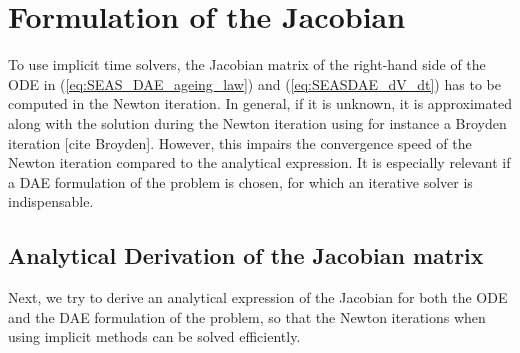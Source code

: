 \section{Formulation of the Jacobian}
To use implicit time solvers, the Jacobian matrix of the right-hand side of the ODE in (\ref{eq:SEAS_DAE_ageing_law}) and (\ref{eq:SEASDAE_dV_dt}) has to be computed in the Newton iteration. In general, if it is unknown, it is approximated along with the solution during the Newton iteration using for instance a Broyden iteration [cite Broyden]. However, this impairs the convergence speed of the Newton iteration compared to the analytical expression. It is especially relevant if a DAE formulation of the problem is chosen, for which an iterative solver is indispensable. 

\subsection{Analytical Derivation of the Jacobian matrix}
\label{ssec:AnalyticalDerivationOfTheJacobianMatrix}
Next, we try to derive an analytical expression of the Jacobian for both the ODE and the DAE formulation of the problem, so that the Newton iterations when using implicit methods can be solved efficiently.  

